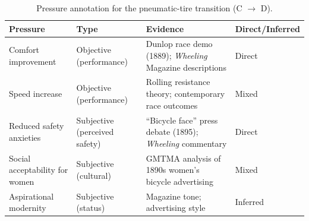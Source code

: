 \begin{table}[ht]
\centering
\caption{Pressure annotation for the pneumatic-tire transition (C $\rightarrow$ D).}
\label{tab:pilot-pressures}
\begin{tabular}{l l l p{6cm}}
\toprule
\textbf{Pressure} & \textbf{Type} & \textbf{Evidence} & \textbf{Direct/Inferred} \\
\midrule
Comfort improvement & Objective (performance) & Dunlop race demo (1889); \textit{Wheeling} Magazine descriptions & Direct \\
Speed increase & Objective (performance) & Rolling resistance theory; contemporary race outcomes & Mixed \\
Reduced safety anxieties & Subjective (perceived safety) & ``Bicycle face'' press debate (1895); \textit{Wheeling} commentary & Direct \\
Social acceptability for women & Subjective (cultural) & GMTMA analysis of 1890s women's bicycle advertising & Mixed \\
Aspirational modernity & Subjective (status) & Magazine tone; advertising style & Inferred \\
\bottomrule
\end{tabular}
\end{table}
